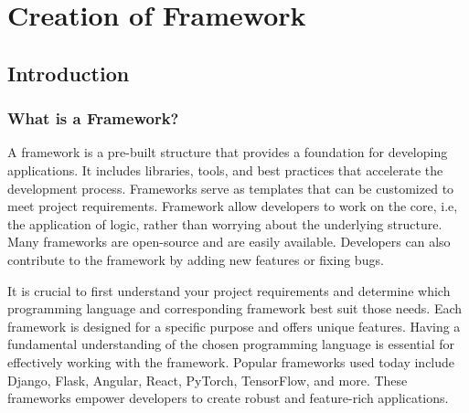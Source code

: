 \chapter{Creation of Framework}
\section{Introduction}
\subsection{What is a Framework?}
A framework is a pre-built structure that provides a foundation for developing applications. It includes libraries, tools, and best practices that accelerate 
the development process. Frameworks serve as templates that can be customized to meet project requirements. Framework allow developers to work on the core, i.e,
the application of logic, rather than worrying about the underlying structure. Many frameworks are open-source and are easily available. Developers can also
contribute to the framework by adding new features or fixing bugs.

It is crucial to first understand your project requirements and determine which programming language and corresponding framework best suit those needs. 
Each framework is designed for a specific purpose and offers unique features. Having a fundamental understanding of the chosen programming language is 
essential for effectively working with the framework. Popular frameworks used today include Django, Flask, Angular, React, PyTorch, TensorFlow, and more. 
These frameworks empower developers to create robust and feature-rich applications.


